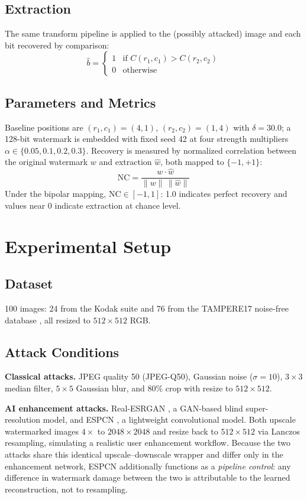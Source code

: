 \documentclass[conference]{IEEEtran}
\begin{document}
\subsection{Extraction}
The same transform pipeline is applied to the (possibly attacked)
image and each bit recovered by comparison:
\begin{equation}
\hat{b} =
\begin{cases}
1 & \text{if } C(r_1,c_1) > C(r_2,c_2) \\
0 & \text{otherwise}
\end{cases}
\end{equation}

\subsection{Parameters and Metrics}
Baseline positions are $(r_1,c_1)=(4,1)$, $(r_2,c_2)=(1,4)$ with
$\delta=30.0$; a 128-bit watermark is embedded with fixed seed 42 at
four strength multipliers $\alpha \in \{0.05, 0.1, 0.2, 0.3\}$.
Recovery is measured by normalized correlation between the original
watermark $w$ and extraction $\hat{w}$, both mapped to $\{-1,+1\}$:
\begin{equation}
\mathrm{NC} = \frac{w \cdot \hat{w}}{\lVert w \rVert\, \lVert \hat{w} \rVert}
\end{equation}
Under the bipolar mapping, $\mathrm{NC} \in [-1,1]$: 1.0 indicates
perfect recovery and values near 0 indicate extraction at chance
level.

\section{Experimental Setup}
\label{sec:setup}

\subsection{Dataset}
100 images: 24 from the Kodak suite \cite{kodak} and 76 from the
TAMPERE17 noise-free database \cite{tampere17}, all resized to
$512\times512$ RGB.

\subsection{Attack Conditions}
\textbf{Classical attacks.} JPEG quality 50 (JPEG-Q50), Gaussian noise
($\sigma=10$), $3\times3$ median filter, $5\times5$ Gaussian blur, and
80\% crop with resize to $512\times512$.

\textbf{AI enhancement attacks.} Real-ESRGAN \cite{realesrgan2021}, a
GAN-based blind super-resolution model, and ESPCN \cite{espcn2016}, a
lightweight convolutional model. Both upscale watermarked images
$4\times$ to $2048\times2048$ and resize back to $512\times512$ via
Lanczos resampling, simulating a realistic user enhancement workflow.
Because the two attacks share this identical upscale--downscale
wrapper and differ only in the enhancement network, ESPCN additionally
functions as a \emph{pipeline control}: any difference in watermark
damage between the two is attributable to the learned reconstruction,
not to resampling.
\end{document}
